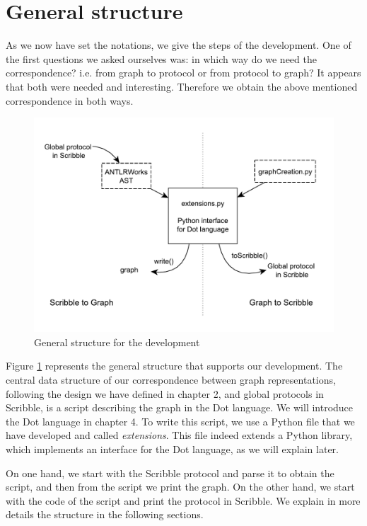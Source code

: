\documentclass[a4paper,11pt,twoside]{report}
\begin{document}
\section{General structure}
As we now have set the notations, we give the steps of the development. One of the first questions we asked ourselves was: in which way do we need the correspondence? i.e. from graph to protocol or from protocol to graph? It appears that both were needed and interesting. Therefore we obtain the above mentioned correspondence in both ways.

\begin{figure}[h]
\begin{center}
\includegraphics[scale=0.7]{structure}
\end{center}
\caption{General structure for the development}\label{fig:structure}
\end{figure}

Figure \ref{fig:structure} represents the general structure that supports our development. The central data structure of our correspondence between graph representations, following the design we have defined in chapter 2, and global protocols in Scribble, is a script describing the graph in the Dot language. We will introduce the Dot language in chapter 4. To write this script, we use a Python file that we have developed and called \emph{extensions}. This file indeed extends a Python library, which implements an interface for the Dot language, as we will explain later.

On one hand, we start with the Scribble protocol and parse it to obtain the script, and then from the script we print the graph. On the other hand, we start with the code of the script and print the protocol in Scribble. We explain in more details the structure in the following sections.
\end{document}
